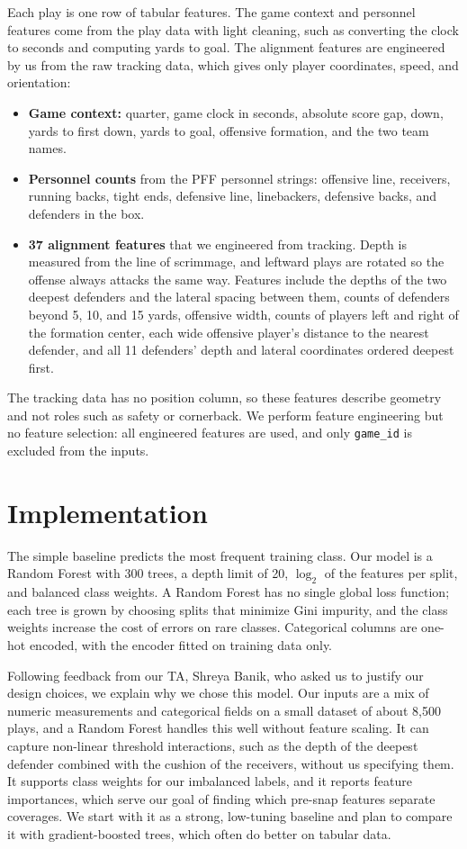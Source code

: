 \documentclass[11pt]{article}
\begin{document}
Each play is one row of tabular features. The game context and personnel features come from the play data with light cleaning, such as converting the clock to seconds and computing yards to goal. The alignment features are engineered by us from the raw tracking data, which gives only player coordinates, speed, and orientation:
\begin{itemize}
  \item \textbf{Game context:} quarter, game clock in seconds, absolute score gap, down, yards to first down, yards to goal, offensive formation, and the two team names.
  \item \textbf{Personnel counts} from the PFF personnel strings: offensive line, receivers, running backs, tight ends, defensive line, linebackers, defensive backs, and defenders in the box.
  \item \textbf{37 alignment features} that we engineered from tracking. Depth is measured from the line of scrimmage, and leftward plays are rotated so the offense always attacks the same way. Features include the depths of the two deepest defenders and the lateral spacing between them, counts of defenders beyond 5, 10, and 15 yards, offensive width, counts of players left and right of the formation center, each wide offensive player's distance to the nearest defender, and all 11 defenders' depth and lateral coordinates ordered deepest first.
\end{itemize}
The tracking data has no position column, so these features describe geometry and not roles such as safety or cornerback. We perform feature engineering but no feature selection: all engineered features are used, and only \texttt{game\_id} is excluded from the inputs.

\section{Implementation}

The simple baseline predicts the most frequent training class. Our model is a Random Forest with 300 trees, a depth limit of 20, $\log_2$ of the features per split, and balanced class weights. A Random Forest has no single global loss function; each tree is grown by choosing splits that minimize Gini impurity, and the class weights increase the cost of errors on rare classes. Categorical columns are one-hot encoded, with the encoder fitted on training data only.

Following feedback from our TA, Shreya Banik, who asked us to justify our design choices, we explain why we chose this model. Our inputs are a mix of numeric measurements and categorical fields on a small dataset of about 8,500 plays, and a Random Forest handles this well without feature scaling. It can capture non-linear threshold interactions, such as the depth of the deepest defender combined with the cushion of the receivers, without us specifying them. It supports class weights for our imbalanced labels, and it reports feature importances, which serve our goal of finding which pre-snap features separate coverages. We start with it as a strong, low-tuning baseline and plan to compare it with gradient-boosted trees, which often do better on tabular data.
\end{document}
